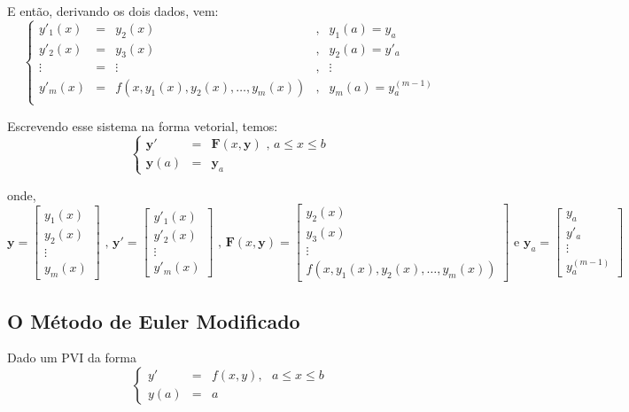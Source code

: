 E então, derivando os dois dados, vem:
\[
	\left \{
		\begin{array}{lllll}
			y'_{1}(x) & = & y_{2}(x) & , & y_{1}(a) = y_{a} \\
			y'_{2}(x) & = & y_{3}(x) & , & y_{2}(a) = y'_{a} \\
			\vdots   & = & \vdots  & , & \vdots \\
			y'_{m}(x) & = & f(x, y_{1}(x), y_{2}(x), \dots, y_{m}(x)) & , & y_{m}(a) = y^{(m-1)}_a \\
		\end{array}
	\right .
\]

Escrevendo esse sistema na forma vetorial, temos:
\[
	\left \{
		\begin{array}{lll}
			\mathbf{y}'   & = & \mathbf{F}(x, \mathbf{y}) \text{ , } a \leq x \leq b \\
			\mathbf{y}(a) & = & \mathbf{y}_{a}
		\end{array}
	\right .
\]

onde,
\[
	\mathbf{y} = 
	\begin{bmatrix}
		y_1(x) \\
		y_2(x) \\
		\vdots \\
		y_m(x) 
	\end{bmatrix}
	\text{ , }
	\mathbf{y}' =
	\begin{bmatrix}
		y'_1(x) \\
		y'_2(x) \\
		\vdots \\
		y'_m(x) 
	\end{bmatrix}
	\text{ , }
	\mathbf{F}(x, \mathbf{y}) =
	\begin{bmatrix}
		y_2(x) \\
		y_3(x) \\
		\vdots \\
		f(x, y_{1}(x), y_{2}(x), \dots, y_{m}(x))
	\end{bmatrix}
	\text{ e }
	\mathbf{y}_a =
	\begin{bmatrix}
		y_a \\
		y'_a \\
		\vdots \\
		y^{(m-1)}_a
	\end{bmatrix}
\]

\subsection{O Método de Euler Modificado}

Dado um PVI da forma
\[
	\left \{
		\begin{array}{lll}
			y'   & = & f(x, y) , \text{  } a \leq x \leq b \\
			y(a) & = & a
		\end{array}
	\right .
\]

